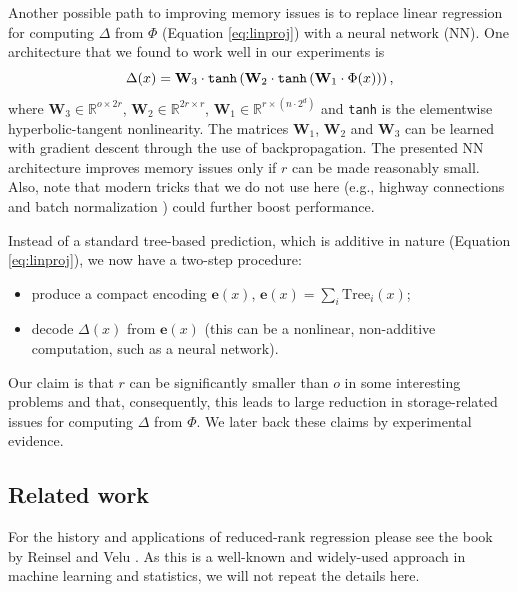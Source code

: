 \documentclass{article}
\begin{document}
	Another possible path to improving memory issues is to replace linear regression for computing $\Delta$ from $\Phi$ (Equation \eqref{eq:linproj}) with a neural network (NN).
	One architecture that we found to work well in our experiments is
	\begin{equation}\label{eq:nneq}
		\Delta(x)=
		\mathbf{W}_3\cdot\text{\texttt{tanh}}\left(\mathbf{W}_2\cdot\text{\texttt{tanh}}\left(\mathbf{W}_{1}\cdot\Phi(x)\right)\right)
		,
	\end{equation}
	where $\mathbf{W}_3\in\mathbb{R}^{o\times 2r}$, $\mathbf{W}_2\in\mathbb{R}^{2r\times r}$, $\mathbf{W}_1\in\mathbb{R}^{r\times(n\cdot 2^d)}$ and \texttt{tanh} is the elementwise hyperbolic-tangent nonlinearity.
	The matrices $\mathbf{W}_1$, $\mathbf{W}_2$ and $\mathbf{W}_3$ can be learned with gradient descent through the use of backpropagation.
	The presented NN architecture improves memory issues only if $r$ can be made reasonably small.
	Also, note that modern tricks that we do not use here (e.g., highway connections \cite{highway} and batch normalization \cite{bnorm}) could further boost performance.

	Instead of a standard tree-based prediction, which is additive in nature (Equation \eqref{eq:linproj}),
	we now have a two-step procedure:
	\begin{itemize}
		\item
			produce a compact encoding $\mathbf{e}(x)$, $\mathbf{e}(x)=\sum_i\text{Tree}_i(x)$;
		\item
			decode $\Delta(x)$ from $\mathbf{e}(x)$
			(this can be a nonlinear, non-additive computation, such as a neural network).
	\end{itemize}

	Our claim is that $r$ can be significantly smaller than $o$ in some interesting problems and that, consequently, this leads to large reduction in storage-related issues for computing $\Delta$ from $\Phi$.
	We later back these claims by experimental evidence.

	\subsection{Related work}
		For the history and applications of reduced-rank regression please see the book by Reinsel and Velu \cite{rrr}.
		As this is a well-known and widely-used approach in machine learning and statistics, we will not repeat the details here.
\end{document}
